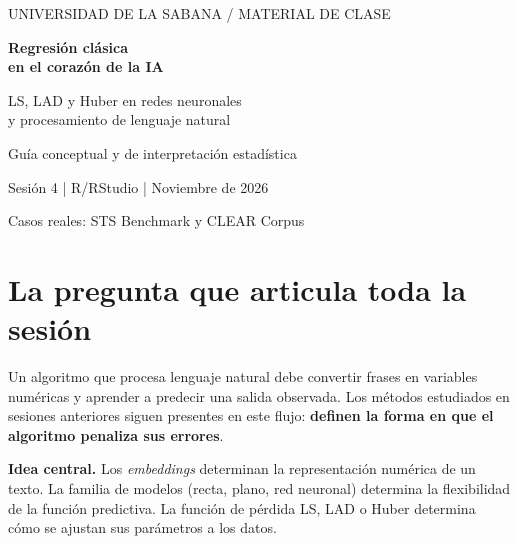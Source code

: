 \documentclass[11pt,a4paper]{article}
\begin{document}
\begin{titlepage}
\vspace*{26mm}
{\color{white}\large UNIVERSIDAD DE LA SABANA \quad / \quad MATERIAL DE CLASE\par}
\vspace{14mm}
{\color{white}\Huge\bfseries Regresión clásica \\
en el corazón de la IA\par}
\vspace{8mm}
{\color{white}\LARGE LS, LAD y Huber en redes neuronales\\
y procesamiento de lenguaje natural\par}
\vfill
{\color{white}\Large Guía conceptual y de interpretación estadística\par}
\vspace{5mm}
{\color{white}\normalsize Sesión 4 \quad | \quad R/RStudio \quad | \quad Noviembre de 2026\par}
\vspace{10mm}
{\color{white}\normalsize Casos reales: STS Benchmark y CLEAR Corpus\par}
\end{titlepage}

\tableofcontents
\newpage

\section{La pregunta que articula toda la sesión}

Un algoritmo que procesa lenguaje natural debe convertir frases en variables numéricas y aprender a predecir una salida observada. Los métodos estudiados en sesiones anteriores siguen presentes en este flujo: \textbf{definen la forma en que el algoritmo penaliza sus errores}.

\begin{idea}
\textbf{Idea central.} Los \emph{embeddings} determinan la representación numérica de un texto. La familia de modelos (recta, plano, red neuronal) determina la flexibilidad de la función predictiva. La función de pérdida LS, LAD o Huber determina cómo se ajustan sus parámetros a los datos.
\end{idea}
\end{document}
